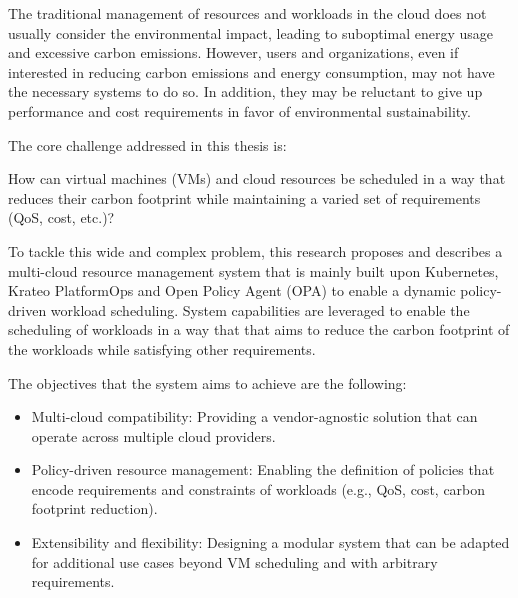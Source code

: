 
The traditional management of resources and workloads in the cloud does not usually consider the environmental impact, leading to suboptimal energy usage and excessive carbon emissions.
However, users and organizations, even if interested in reducing carbon emissions and energy consumption, may not have the necessary systems to do so.
In addition, they may be reluctant to give up performance and cost requirements in favor of environmental sustainability.

The core challenge addressed in this thesis is:
\begin{center}
    How can virtual machines (VMs) and cloud resources be scheduled in a way that reduces their carbon footprint while maintaining a varied set of requirements (QoS, cost, etc.)?
\end{center}

To tackle this wide and complex problem, this research proposes and describes a multi-cloud resource management system that is mainly built upon Kubernetes, Krateo PlatformOps and Open Policy Agent (OPA) to enable a dynamic policy-driven workload scheduling.
System capabilities are leveraged to enable the scheduling of workloads in a way that that aims to reduce the carbon footprint of the workloads while satisfying other requirements.

The objectives that the system aims to achieve are the following:
\begin{itemize}
    \item Multi-cloud compatibility: Providing a vendor-agnostic solution that can operate across multiple cloud providers.
    \item Policy-driven resource management: Enabling the definition of policies that encode requirements and constraints of workloads (e.g., QoS, cost, carbon footprint reduction).
    \item Extensibility and flexibility: Designing a modular system that can be adapted for additional use cases beyond VM scheduling and with arbitrary requirements.
\end{itemize}



